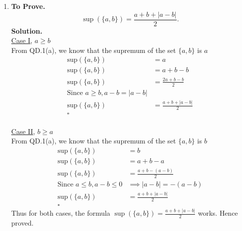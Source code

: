 \documentclass[11pt]{article}
\begin{document}
\begin{enumerate}
\begin{enumerate}
		      \item \textbf{To Prove.}  $$
			            \sup (\{a, b\})=\frac{a+b+|a-b|}{2} .
		            $$
		            \textbf{Solution.} \\
		            \underline{Case I}, $a \geq b$\\
		            From QD.1(a), we know that the supremum of the set $\{a, b\}$ is $a$
		            \begin{align*}
			            \text{sup}(\{a, b\}) & = a                         \\
			            \text{sup}(\{a, b\}) & = a + b - b                 \\
			            \text{sup}(\{a, b\}) & = \frac{2a +b - b}{2}       \\ \text{Since } a \geq b, a - b = |a - b| \\
			            \text{sup}(\{a, b\}) & = \frac{a + b + |a - b|}{2}
			            \\ \square
		            \end{align*}
		            \\
		            \underline{Case II}, $b \geq a$\\
		            From QD.1(a), we know that the supremum of the set $\{a, b\}$ is $b$
		            \begin{align*}
			            \text{sup}(\{a, b\})                 & = b                     \\
			            \text{sup}(\{a, b\})                 & = a + b - a             \\
			            \text{sup}(\{a, b\})                 & = \frac{a+b-(a-b)}{2}   \\
			            \text{Since } a \leq b, a - b \leq 0 & \implies |a-b| = -(a-b) \\
			            \text{sup}(\{a, b\})                 & = \frac{a+b+|a-b|}{2}
			            \\ \square
		            \end{align*}
		            Thus for both cases, the formula $\sup (\{a, b\})=\frac{a+b+|a-b|}{2} $ works. Hence proved.




\end{enumerate}
\end{enumerate}
\end{document}
